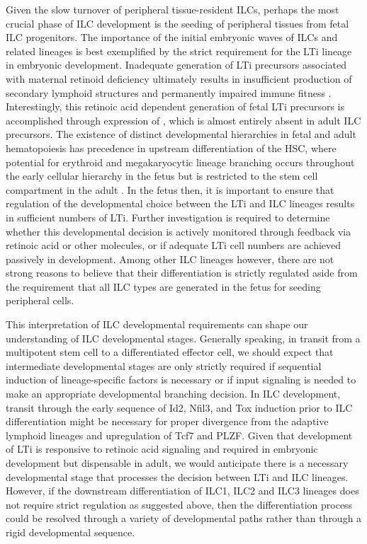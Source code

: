 Given the slow turnover of peripheral tissue-resident ILCs, perhaps the most crucial phase of ILC development is the seeding of peripheral tissues from fetal ILC progenitors. The importance of the initial embryonic waves of ILCs and related lineages is best exemplified by the strict requirement for the LTi lineage in embryonic development. Inadequate generation of LTi precursors associated with maternal retinoid deficiency ultimately results in insufficient production of secondary lymphoid structures and permanently impaired immune fitness \cite{van2014}. Interestingly, this retinoic acid dependent generation of fetal LTi precursors is accomplished through expression of \RORgt, which is almost entirely absent in adult ILC precursors. The existence of distinct developmental hierarchies in fetal and adult hematopoiesis has precedence in upstream differentiation of the HSC, where potential for erythroid and megakaryocytic lineage branching occurs throughout the early cellular hierarchy in the fetus but is restricted to the stem cell compartment in the adult \cite{notta2016}. In the fetus then, it is important to ensure that regulation of the developmental choice between the LTi and ILC lineages results in sufficient numbers of LTi. Further investigation is required to determine whether this developmental decision is actively monitored through feedback via retinoic acid or other molecules, or if adequate LTi cell numbers are achieved passively in development. Among other ILC lineages however, there are not strong reasons to believe that their differentiation is strictly regulated aside from the requirement that all ILC types are generated in the fetus for seeding peripheral cells. 

This interpretation of ILC developmental requirements can shape our understanding of ILC developmental stages. Generally speaking, in transit from a multipotent stem cell to a differentiated effector cell, we should expect that intermediate developmental stages are only strictly required if sequential induction of lineage-specific factors is necessary or if input signaling is needed to make an appropriate developmental branching decision. In ILC development, transit through the early sequence of Id2, Nfil3, and Tox induction prior to ILC differentiation might be necessary for proper divergence from the adaptive lymphoid lineages and upregulation of Tcf7 and PLZF. Given that development of LTi is responsive to retinoic acid signaling and required in embryonic development but dispensable in adult, we would anticipate there is a necessary developmental stage that processes the decision between LTi and ILC lineages. However, if the downstream differentiation of ILC1, ILC2 and ILC3 lineages does not require strict regulation as suggested above, then the differentiation process could be resolved through a variety of developmental paths rather than through a rigid developmental sequence. 

